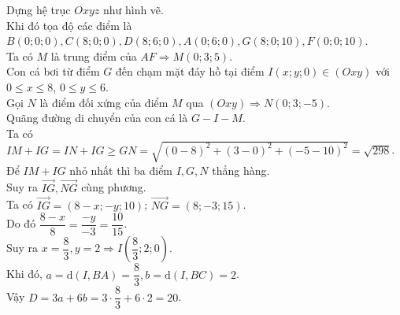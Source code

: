 \begin{bt}
{\begin{center}
		\end{center}
		Dựng hệ trục $Oxyz$ như  hình vẽ.\\
		Khi đó tọa độ các điểm là $B(0; 0;  0), C(8; 0; 0), D(8; 6; 0), A(0; 6; 0), G(8; 0; 10), F(0; 0; 10)$.\\
		Ta có $M$ là trung điểm của $A F \Rightarrow M(0; 3; 5)$.\\ 
		Con cá bơi từ điểm $G$ đến chạm mặt đáy hồ tại điểm $I(x; y; 0) \in(Oxy)$ với $0 \leq  x \leq 8$, $0 \leq y \leq 6$.\\
		Gọi $N$ là điểm đối xứng  của điểm $M$ qua $(Oxy) \Rightarrow N(0; 3;-5)$.\\
		Quãng đường di chuyển của con cá là $G-I-M$.\\ 
		Ta  có $I M+I G=I N+I G \geq G N=\sqrt{(0-8)^{2}+(3-0)^{2}+(-5-10)^{2}}=\sqrt{298}$.\\
		Để $I M+I G$ nhỏ nhất thì ba điểm $I, G, N$ thẳng hàng.\\ 
		Suy ra $\overrightarrow{I G}, \overrightarrow{N  G}$ cùng phương.\\
		Ta có $\overrightarrow{I  G}=(8-x;-y; 10)$;
		$\overrightarrow{N G}=(8;-3; 15)$.\\ 
		Do  đó $\dfrac{8-x}{8}=\dfrac{-y}{-3}=\dfrac{10}{15}$.\\
		 Suy ra $x=\dfrac{8}{3}, y=2 \Rightarrow I\left(\dfrac{8}{3}; 2; 0\right)$.\\
		Khi đó, $a=\mathrm{d}(I, B A)=\dfrac{8}{3}, b=\mathrm{d}(I,  B C)=2$.\\
	 Vậy $D=3 a+6 b=3 \cdot \dfrac{8}{3}+6 \cdot 2=20$.}
\end{bt}

